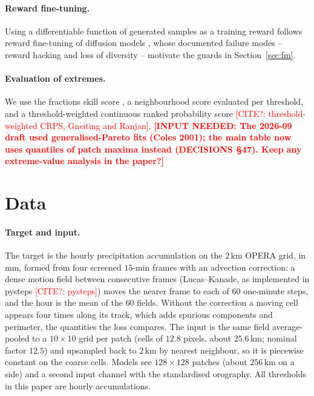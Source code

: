 \documentclass{article}
\newcommand{\needinput}[1]{\textcolor{red}{\textbf{[INPUT NEEDED: #1]}}}
\newcommand{\citeneeded}[1]{\textcolor{red}{[CITE?: #1]}}
\begin{document}
\paragraph{Reward fine-tuning.} Using a differentiable function of generated samples as a training reward follows
reward fine-tuning of diffusion models \citep{clark2024draft}, whose documented failure modes -- reward hacking and
loss of diversity -- motivate the guards in Section~\ref{sec:fm}.

\paragraph{Evaluation of extremes.} We use the fractions skill score \citep{roberts2008fss}, a neighbourhood score
evaluated per threshold, and a threshold-weighted continuous ranked probability score \citeneeded{threshold-weighted
CRPS, Gneiting and Ranjan}. \needinput{The 2026-09 draft used generalised-Pareto fits (Coles 2001); the main table
now uses quantiles of patch maxima instead (DECISIONS §47). Keep any extreme-value analysis in the paper?}

\section{Data}
\label{sec:data}
\paragraph{Target and input.} The target is the hourly precipitation accumulation on the $2\,\mathrm{km}$ OPERA grid,
in $\mathrm{mm}$, formed from four screened $15$-min frames with an advection correction: a dense motion field
between consecutive frames (Lucas--Kanade, as implemented in pysteps \citeneeded{pysteps}) moves the nearer frame to
each of $60$ one-minute steps, and the hour is the mean of the $60$ fields. Without the correction a moving cell
appears four times along its track, which adds spurious components and perimeter, the quantities the loss compares. The input is the same
field average-pooled to a $10\times10$ grid per patch (cells of $12.8$ pixels, about $25.6\,\mathrm{km}$; nominal
factor $12.5$) and upsampled back to $2\,\mathrm{km}$ by nearest neighbour, so it is piecewise constant on the coarse
cells. Models see $128\times128$ patches (about $256\,\mathrm{km}$ on a side) and a second input channel with the
standardised orography. All thresholds in this paper are hourly accumulations.
\end{document}
